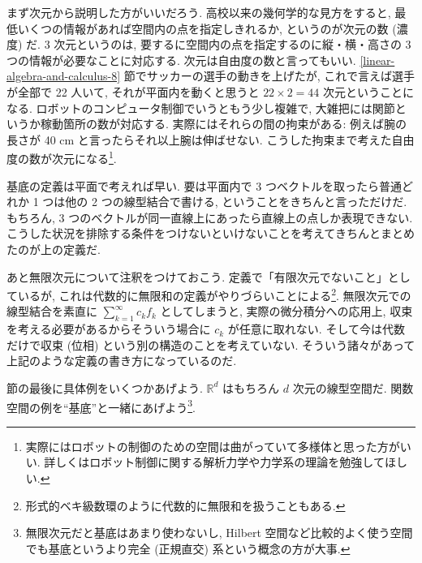 \documentclass[openany, a4paper, oneside]{jsbook}
\theoremstyle{break}
\theoremstyle{breakdefn}
\newcommand{\bbR}{\mathbb{R}}
\begin{document}
まず次元から説明した方がいいだろう.
高校以来の幾何学的な見方をすると,
最低いくつの情報があれば空間内の点を指定しきれるか, というのが次元の数 (濃度) だ.
3 次元というのは, 要するに空間内の点を指定するのに縦・横・高さの 3 つの情報が必要なことに対応する.
次元は自由度の数と言ってもいい.
\ref{linear-algebra-and-calculus-8} 節でサッカーの選手の動きを上げたが,
これで言えば選手が全部で 22 人いて, それが平面内を動くと思うと $22 \times 2 = 44$ 次元ということになる.
ロボットのコンピュータ制御でいうともう少し複雑で,
大雑把には関節というか稼動箇所の数が対応する.
実際にはそれらの間の拘束がある: 例えば腕の長さが 40 cm と言ったらそれ以上腕は伸ばせない.
こうした拘束まで考えた自由度の数が次元になる\footnote{実際にはロボットの制御のための空間は曲がっていて多様体と思った方がいい.
詳しくはロボット制御に関する解析力学や力学系の理論を勉強してほしい.
 }.

基底の定義は平面で考えれば早い.
要は平面内で 3 つベクトルを取ったら普通どれか 1 つは他の
2 つの線型結合で書ける, ということをきちんと言っただけだ.
もちろん, 3 つのベクトルが同一直線上にあったら直線上の点しか表現できない.
こうした状況を排除する条件をつけないといけないことを考えてきちんとまとめたのが上の定義だ.

あと無限次元について注釈をつけておこう.
定義で「有限次元でないこと」としているが, これは代数的に無限和の定義がやりづらいことによる\footnote{形式的ベキ級数環のように代数的に無限和を扱うこともある.
 }.
無限次元での線型結合を素直に $\sum_{k=1}^{\infty} c_k f_k$ としてしまうと,
実際の微分積分への応用上, 収束を考える必要があるからそういう場合に $c_k$ が任意に取れない.
そして今は代数だけで収束 (位相) という別の構造のことを考えていない.
そういう諸々があって上記のような定義の書き方になっているのだ.

節の最後に具体例をいくつかあげよう.
$\bbR^d$ はもちろん $d$ 次元の線型空間だ.
関数空間の例を``基底''と一緒にあげよう\footnote{無限次元だと基底はあまり使わないし,
Hilbert 空間など比較的よく使う空間でも基底というより完全 (正規直交) 系という概念の方が大事.
 }.
\end{document}
